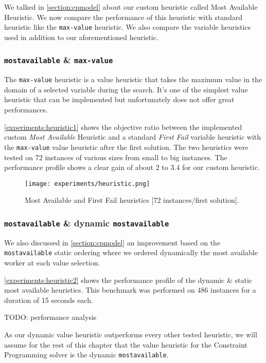 \documentclass[../../thesis.tex]{subfiles}
\begin{document}
We talked in \autoref{section:cpmodel} about our custom heuristic called Most Available Heuristic.
We now compare the performance of this heuristic with standard heuristic like the \texttt{max-value} heuristic.
We also compare the variable heuristics used in addition to our aforementioned heuristic.

\subsubsection{\texttt{mostavailable} \& \texttt{max-value}}

The \texttt{max-value} heuristic is a value heuristic that takes the maximum value in the domain of a selected variable during the search.
It's one of the simplest value heuristic that can be implemented but unfortunately does not offer great performances.

\autoref{experiments:heuristic1} shows the objective ratio between the implemented custom \textit{Most Available} Heuristic and a standard 
\textit{First Fail} variable heuristic with the \texttt{max-value} value heuristic after the first solution.
The two heuristics were tested on 72 instances of various sizes from small to big instances.
The performance profile shows a clear gain of about $2$ to $3.4$ for our custom heuristic.


\begin{figure}
  \centering
  \texttt{[image: experiments/heuristic.png]}
  \caption{Most Available and First Fail heuristics [72 instances/first solution].}
  \label{experiments:heuristic1}
\end{figure}


\subsubsection{\texttt{mostavailable} \& dynamic \texttt{mostavailable}}

We also discussed in \autoref{section:cpmodel} an improvement based on the \texttt{mostavailable} static ordering
where we ordered dynamically the most available worker at each value selection.

\autoref{experiments:heuristic2} shows the performance profile of the dynamic \& static most available heuristics.
This benchmark was performed on 486 instances for a duration of 15 seconds each.

TODO: performance analysis



As our dynamic value heuristic outperforms every other tested heuristic, we will assume for the rest of this chapter 
that the value heuristic for the Constraint Programming solver is the dynamic \texttt{mostavailable}.
\end{document}
